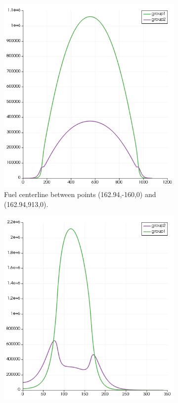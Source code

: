 \documentclass[11pt,letterpaper]{article}
\begin{document}
	\begin{figure}[htbp!]
		\centering
		\begin{subfigure}[t]{0.4\textwidth}
			\centering
			\includegraphics[width=\linewidth]{2D-fullcore-reflec-homo-action1}
			\caption{Fuel centerline between points (162.94,-160,0) and (162.94,913,0).}
		\end{subfigure}
		\begin{subfigure}[t]{0.4\textwidth}
			\centering
			\includegraphics[width=\linewidth]{2D-fullcore-reflec-homo-action2}

\end{subfigure}
\end{figure}
\end{document}
